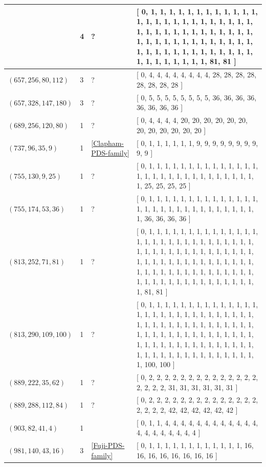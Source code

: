 \documentclass[12pt]{amsproc} %
\theoremstyle{definition}\newtheorem{defn}[thm]{Definition}
\theoremstyle{definition}\newtheorem{rem}[thm]{Remark}
\theoremstyle{definition}\newtheorem{ex}[thm]{Example}
\begin{document}
\begin{center}
\begin{longtable}{p{3.66cm}|P{0.8cm}|P{0.69cm}|p{10cm}}
		   & 4 & ? & [ 0, 1, 1, 1, 1, 1, 1, 1, 1, 1, 1, 1, 1, 1, 1, 1, 1, 1, 1, 1, 1, 1, 1, 1, 1, 1, 1, 1, 1, 1, 1, 1, 1, 1, 1, 1, 1, 1, 1, 1, 1, 1, 1, 1, 1, 1, 1, 1, 1, 1, 1, 1, 1, 1, 1, 1, 1, 1, 1, 1, 1, 1, 1, 1, 1, 1, 1, 1, 1, 1, 1, 1, 1, 81, 81 ] \\
		\hline
		 $(657, 256, 80, 112)$  & 3 & ? & [ 0, 4, 4, 4, 4, 4, 4, 4, 4, 28, 28, 28, 28, 28, 28, 28, 28 ] \\
		\hline
		 $(657, 328, 147, 180)$  & 3 & ? & [ 0, 5, 5, 5, 5, 5, 5, 5, 5, 36, 36, 36, 36, 36, 36, 36, 36 ] \\
		\hline
		 $(689, 256, 120, 80)$  & 1 & ? & [ 0, 4, 4, 4, 4, 20, 20, 20, 20, 20, 20, 20, 20, 20, 20, 20, 20 ] \\
		\hline
		 $(737, 96, 35, 9)$  & 1 & \ref{Clapham-PDS-family} & [ 0, 1, 1, 1, 1, 1, 1, 9, 9, 9, 9, 9, 9, 9, 9, 9, 9 ] \\
		\hline
		 $(755, 130, 9, 25)$  & 1 & ? & [ 0, 1, 1, 1, 1, 1, 1, 1, 1, 1, 1, 1, 1, 1, 1, 1, 1, 1, 1, 1, 1, 1, 1, 1, 1, 1, 1, 1, 1, 1, 1, 25, 25, 25, 25 ] \\
		\hline
		 $(755, 174, 53, 36)$  & 1 & ? & [ 0, 1, 1, 1, 1, 1, 1, 1, 1, 1, 1, 1, 1, 1, 1, 1, 1, 1, 1, 1, 1, 1, 1, 1, 1, 1, 1, 1, 1, 1, 1, 36, 36, 36, 36 ] \\
		\hline
		 $(813, 252, 71, 81)$  & 1 & ? & [ 0, 1, 1, 1, 1, 1, 1, 1, 1, 1, 1, 1, 1, 1, 1, 1, 1, 1, 1, 1, 1, 1, 1, 1, 1, 1, 1, 1, 1, 1, 1, 1, 1, 1, 1, 1, 1, 1, 1, 1, 1, 1, 1, 1, 1, 1, 1, 1, 1, 1, 1, 1, 1, 1, 1, 1, 1, 1, 1, 1, 1, 1, 1, 1, 1, 1, 1, 1, 1, 1, 1, 1, 1, 1, 1, 1, 1, 1, 1, 1, 1, 1, 1, 1, 1, 1, 1, 1, 1, 1, 1, 81, 81 ] \\
		\hline
		 $(813, 290, 109, 100)$  & 1 & ? & [ 0, 1, 1, 1, 1, 1, 1, 1, 1, 1, 1, 1, 1, 1, 1, 1, 1, 1, 1, 1, 1, 1, 1, 1, 1, 1, 1, 1, 1, 1, 1, 1, 1, 1, 1, 1, 1, 1, 1, 1, 1, 1, 1, 1, 1, 1, 1, 1, 1, 1, 1, 1, 1, 1, 1, 1, 1, 1, 1, 1, 1, 1, 1, 1, 1, 1, 1, 1, 1, 1, 1, 1, 1, 1, 1, 1, 1, 1, 1, 1, 1, 1, 1, 1, 1, 1, 1, 1, 1, 1, 1, 100, 100 ] \\
		\hline
		 $(889, 222, 35, 62)$  & 1 & ? & [ 0, 2, 2, 2, 2, 2, 2, 2, 2, 2, 2, 2, 2, 2, 2, 2, 2, 2, 2, 31, 31, 31, 31, 31, 31 ] \\
		\hline
		 $(889, 288, 112, 84)$  & 1 & ? & [ 0, 2, 2, 2, 2, 2, 2, 2, 2, 2, 2, 2, 2, 2, 2, 2, 2, 2, 2, 42, 42, 42, 42, 42, 42 ] \\
		\hline
		 $(903, 82, 41, 4)$  & 1 & \cite{pol-dav-smi-swa} & [ 0, 1, 1, 4, 4, 4, 4, 4, 4, 4, 4, 4, 4, 4, 4, 4, 4, 4, 4, 4, 4, 4, 4 ] \\
		\hline
		 $(981, 140, 43, 16)$  & 3 & \ref{Fuji-PDS-family} & [ 0, 1, 1, 1, 1, 1, 1, 1, 1, 1, 1, 1, 1, 16, 16, 16, 16, 16, 16, 16, 16 ] \\

\end{longtable}
\end{center}
\end{document}
